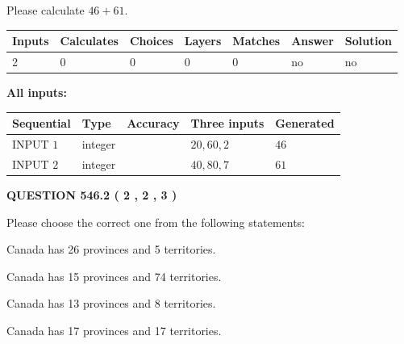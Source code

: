 \documentclass[12pt]{article}
\begin{document}
  
 
Please calculate $ %
46 +  %
61 $.
 
 
   
   
   
   
\noindent\begin{tabular}{|l|l|l|l|l|l|l|}
 \hline
Inputs & Calculates & Choices & Layers & Matches & Answer & Solution \\ \hline
 2  & 
 0  & 
 0
  & 
 0  & 
 0  & 
  no & 
  no 
  \\ \hline
 \end{tabular}
   
   
   
   
\noindent{}
   
   
   
   
\noindent\vspace{0.1in}\hspace{-0.08in} {\textbf{\Large{All inputs: }}}
   
   
  
  
\noindent\begin{tabular}{|l|l|l|l|l|}
\hline
 Sequential & Type & Accuracy & Three inputs & Generated \\ 
\hline
 
 
  INPUT $  1 $ & integer &  & $
 20
 , 
 60
 , 
 2
 $ & $ 46 $ 
 \\  \hline  
 
 
  INPUT $  2 $ & integer &  & $
 40
 , 
 80
 , 
 7
 $ & $ 61 $ 
 \\  \hline  
 \end{tabular}
   
   
  
\vspace{0.2in}
  
{\textbf{\Large{QUESTION
546.2 
 ( 2 , 2 , 3 )
}}}
  
  
Please choose the correct one from the following statements:
 
 
Canada has  26 provinces and  5 territories.
 
 
Canada has  15 provinces and  74 territories.
 
 
Canada has  13 provinces and  8 territories.
 
 
Canada has  17 provinces and  17 territories.
 
\end{document}
